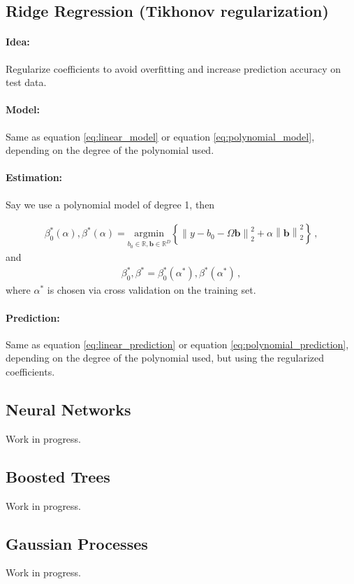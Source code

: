 \documentclass[a4paper, 12pt]{article}
\newcommand{\norm}[1]{\left\lVert#1\right\rVert}
\begin{document}
\subsection{Ridge Regression (Tikhonov regularization)}

\paragraph{Idea:} Regularize coefficients to avoid overfitting and increase prediction accuracy on test data.

\paragraph{Model:} Same as equation \ref{eq:linear_model} or equation \ref{eq:polynomial_model}, depending on the degree of the polynomial used.

\paragraph{Estimation:} Say we use a polynomial model of degree 1, then

\begin{align}
  \beta_0^{*}(\alpha), \beta^{*}(\alpha) = \underset{b_0 \in \mathbb{R}, \bm{b} \in \mathbb{R}^D}{\text{argmin}} \left\{  \norm{y - b_0 - \Omega \bm{b}}_2^2 + \alpha \norm{\bm{b}}_2^2 \right\} \,,
\end{align}
and
\begin{align}
  \beta_0^*, \beta^* = \beta_0^*(\alpha^*), \beta^*(\alpha^*) \,,
\end{align}
where $\alpha^*$ is chosen via cross validation on the training set.

\paragraph{Prediction:} Same as equation \ref{eq:linear_prediction} or equation \ref{eq:polynomial_prediction}, depending on the degree of the polynomial used, but using the regularized coefficients.


\subsection{Neural Networks}
Work in progress.

\subsection{Boosted Trees}
Work in progress.

\subsection{Gaussian Processes}
Work in progress.
\end{document}
